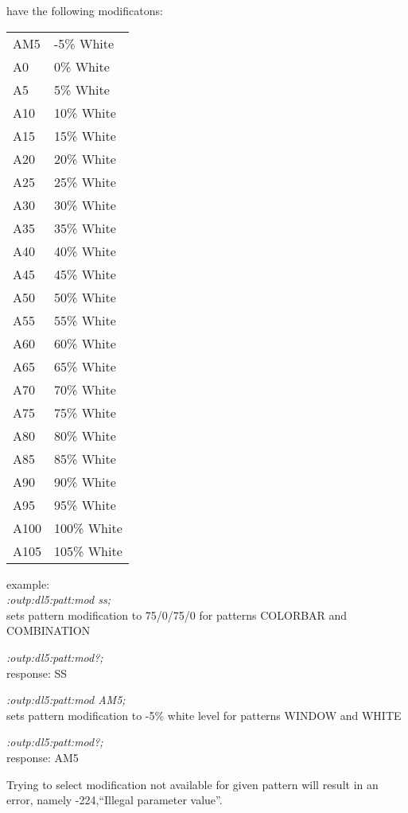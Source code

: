 have the following modificatons:

\begin{tabular}{l l}
AM5   &    -5\% White    \\
A0    &     0\% White    \\
A5    &     5\% White    \\
A10   &    10\% White    \\
A15   &    15\% White    \\ 
A20   &    20\% White    \\
A25   &    25\% White    \\
A30   &    30\% White    \\
A35   &    35\% White    \\
A40   &    40\% White     \\
A45   &    45\% White     \\
A50   &    50\% White     \\
A55   &    55\% White     \\
A60   &    60\% White     \\
A65   &    65\% White     \\
A70   &    70\% White     \\
A75   &    75\% White     \\
A80   &    80\% White     \\
A85   &    85\% White     \\
A90   &    90\% White     \\
A95   &    95\% White     \\
A100  &   100\% White    \\
A105  &   105\% White    \\
\end{tabular}

example:\\

\textit{:outp:dl5:patt:mod ss;}\\
sets pattern modification to 75/0/75/0 for patterns COLORBAR and COMBINATION

\textit{:outp:dl5:patt:mod?;}\\
response: SS

\textit{:outp:dl5:patt:mod AM5;}\\
sets pattern modification to -5\% white level for patterns WINDOW and WHITE

\textit{:outp:dl5:patt:mod?;}\\
response: AM5

Trying to select modification not available for given pattern will result in an error, namely -224,``Illegal parameter value''.


